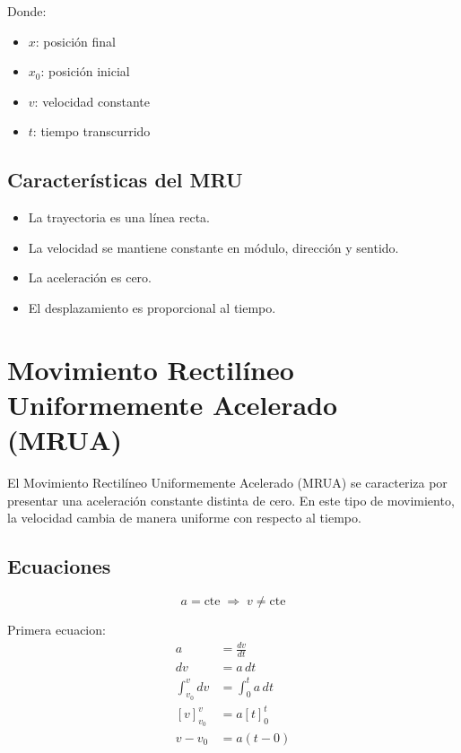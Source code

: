 Donde:
\begin{itemize}
    \setlength{\itemsep}{0pt}
    \item $x$: posición final
    \item $x_0$: posición inicial
    \item $v$: velocidad constante
    \item $t$: tiempo transcurrido
\end{itemize}

\subsection{Características del MRU}

\begin{itemize}
    \setlength{\itemsep}{0pt}
    \item La trayectoria es una línea recta.
    \item La velocidad se mantiene constante en módulo, dirección y sentido.
    \item La aceleración es cero.
    \item El desplazamiento es proporcional al tiempo.
\end{itemize}



\section{Movimiento Rectilíneo Uniformemente Acelerado (MRUA)}

El Movimiento Rectilíneo Uniformemente Acelerado (MRUA) se caracteriza por presentar una aceleración constante distinta de cero. En este tipo de movimiento, la velocidad cambia de manera uniforme con respecto al tiempo.

\subsection{Ecuaciones}
\vspace{-20pt}

\[
a=\text{cte} \;\Rightarrow\; v \neq \text{cte}
\]

\vspace{-20pt}

Primera ecuacion:
\begin{align*}
a &= \frac{dv}{dt}\\
dv &= a\,dt\\
\int_{v_0}^{v} dv &= \int_{0}^{t} a\,dt\\
\left[v\right]_{v_0}^{v} &= a\left[t\right]_{0}^{t}\\
v - v_0 &= a(t-0)
\end{align*}

